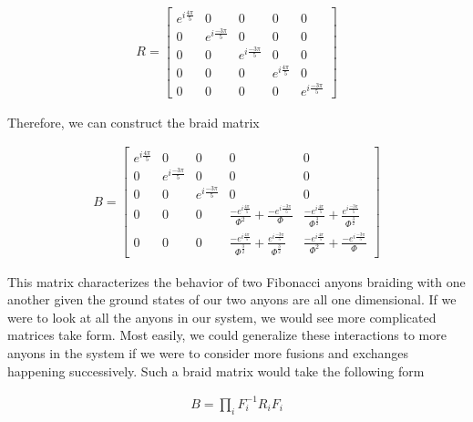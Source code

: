 \documentclass[10pt]{ucthesis}
\begin{document}
\begin{equation}
	\begin{aligned}
		R = \begin{bmatrix}
				e^{i\frac{4\pi}{5}} & 0 & 0 & 0 & 0 \\
				0 & e^{i\frac{-3\pi}{5}} & 0 & 0 & 0 \\
				0 & 0 & e^{i\frac{-3\pi}{5}} & 0 & 0 \\
				0 & 0 & 0 & e^{i\frac{4\pi}{5}} & 0\\
				0 & 0 & 0 & 0 &e^{i\frac{-3\pi}{5}} 
			\end{bmatrix}
	\end{aligned}
\end{equation}

Therefore, we can construct the braid matrix

\begin{equation}
	\begin{aligned}
		B = \begin{bmatrix}
				e^{i\frac{4\pi}{5}} & 0 & 0 & 0 & 0 \\
				0 & e^{i\frac{-3\pi}{5}} & 0 & 0 & 0 \\
				0 & 0 & e^{i\frac{-3\pi}{5}} & 0 & 0 \\
				0 & 0 & 0 & \frac{-e^{i\frac{4\pi}{5}}}{\Phi^2} + \frac{-e^{i\frac{-3\pi}{5}}}{\Phi}& \frac{-e^{i\frac{4\pi}{5}}}{\Phi^\frac{3}{2}} + \frac{e^{i\frac{-3\pi}{5}}}{\Phi^\frac{3}{2}}\\
				0 & 0 & 0&\frac{-e^{i\frac{4\pi}{5}}}{\Phi^\frac{3}{2}} + \frac{e^{i\frac{-3\pi}{5}}}{\Phi^\frac{3}{2}} &\frac{-e^{i\frac{4\pi}{5}}}{\Phi^2} + \frac{-e^{i\frac{-3\pi}{5}}}{\Phi}
			\end{bmatrix}
	\end{aligned}
\end{equation}

This matrix characterizes the behavior of two Fibonacci anyons braiding with one another given the ground states of our two anyons are all one dimensional. If we were to look at all the anyons in our system, we would see more complicated matrices take form. Most easily, we could generalize these interactions to more anyons in the system if we were to consider more fusions and exchanges happening successively. Such a braid matrix would take the following form

\begin{equation}
	\begin{aligned}
		B = \prod_i F_i^{-1}R_iF_i
	\end{aligned}
\end{equation}
\end{document}
